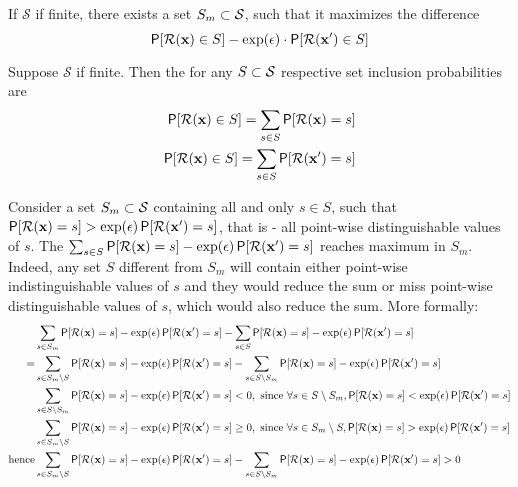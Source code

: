 \documentclass[11pt]{article}
\newcommand{\cR}{\mathcal{R}}
\newcommand{\Ssp}{\mathcal{S}}
\newcommand{\xv}{\mathbf{x}}
\begin{document}
\begin{prop}\label{cr:max} If ${\Ssp}$  if finite, there exists a set $S_m \cont \Ssp$, such that it maximizes the difference
\[ \P[\cR(\xv) \in S]  - \exp(\epsilon) \cdot \P[\cR(\xv') \in S] \]

Suppose ${\Ssp}$  if finite.  Then the for any $S \cont \Ssp$ respective set inclusion probabilities are
\begin{align*}
\P[\cR(\xv) \in S]  = \sum_{s \in S} \P[\cR(\xv) = s]  \\
 \P[\cR(\xv) \in S]  = \sum_{s \in S} \P[\cR(\xv') = s]  \\
\end{align*}

Consider a set  $S_m \cont \Ssp$ containing all and only $s \in S$, such that $\P[\cR(\xv) = s] >  \exp(\epsilon) \P[\cR(\xv') = s]$, that is - all point-wise distinguishable values of $s$.  The  $\sum_{s \in S} \P[\cR(\xv) = s] -  \exp(\epsilon)  \P[\cR(\xv') = s] $ reaches maximum in $S_m$. Indeed, any set $S$ different from $S_m$ will contain either point-wise indistinguishable values of $s$ and they would reduce the sum or miss point-wise distinguishable values of $s$, which would also reduce the sum.   More formally:
\begin{align*}
& \sum_{s \in S_m} \P[\cR(\xv) = s] -  \exp(\epsilon)  \P[\cR(\xv') = s] - \sum_{s \in S} \P[\cR(\xv) = s] -  \exp(\epsilon)  \P[\cR(\xv') = s] \\
= & \sum_{s \in S_m \setminus S} \P[\cR(\xv) = s] -  \exp(\epsilon)  \P[\cR(\xv') = s]  -  \sum_{s \in S \setminus S_m} \P[\cR(\xv) = s] -  \exp(\epsilon)  \P[\cR(\xv') = s] \\
 & \sum_{s \in S \setminus S_m} \P[\cR(\xv) = s] -  \exp(\epsilon)  \P[\cR(\xv') = s]  < 0, \text{ since } \forall s \in S \setminus S_m,   \P[\cR(\xv) = s] < \exp(\epsilon)  \P[\cR(\xv') = s] \\
 & \sum_{s \in S_m \setminus S} \P[\cR(\xv) = s] -  \exp(\epsilon)  \P[\cR(\xv') = s]  \ge 0, \text{ since } \forall s \in S_m \setminus S,   \P[\cR(\xv) = s] > \exp(\epsilon)  \P[\cR(\xv') = s] \\
 \text{hence} &  \sum_{s \in S_m \setminus S} \P[\cR(\xv) = s] -  \exp(\epsilon)  \P[\cR(\xv') = s]  -  \sum_{s \in S \setminus S_m} \P[\cR(\xv) = s] -  \exp(\epsilon)  \P[\cR(\xv') = s] > 0
\end{align*}
\end{prop}
\end{document}
